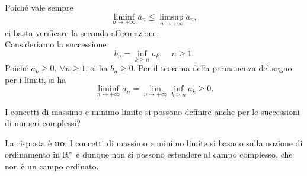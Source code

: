 \begin{solution} Poiché vale sempre
	\begin{equation*}
		\liminf_{n\to +\infty} a_n \leq \limsup_{n\to +\infty} a_n,
	\end{equation*}
ci basta verificare la seconda affermazione.\\
Consideriamo la successione
	\begin{equation*}
		b_n=\inf_{k\geq n} a_k,\quad n\geq 1.
	\end{equation*}	
	Poiché $a_k\geq 0,\ \forall n\geq 1$, si ha $b_n\geq 0$. Per il teorema della permanenza del segno per i limiti, si ha
	\begin{equation*}
		\liminf_{n\to +\infty} a_n=\lim_{n\to+\infty}\inf_{k\geq n} a_k\geq 0.
	\end{equation*}
\end{solution}
\begin{exercise}
	I concetti di massimo e minimo limite si possono definire anche per le successioni di numeri complessi?
\end{exercise}
\begin{solution}
	La risposta è \textbf{no}.  I concetti di massimo e minimo limite si basano sulla nozione di ordinamento in $\mathbb{R}^{\ast}$ e dunque non si possono estendere al campo complesso, che non è un campo ordinato.
\end{solution}
